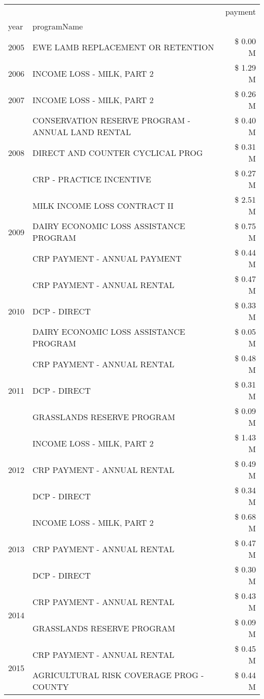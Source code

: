 \begin{tabular}{llr}
\toprule
 &  & payment \\
year & programName &  \\
\midrule
2005 & EWE LAMB REPLACEMENT OR RETENTION & \$ 0.00 M \\
\cline{1-3}
2006 & INCOME LOSS - MILK, PART 2 & \$ 1.29 M \\
\cline{1-3}
2007 & INCOME LOSS - MILK, PART 2 & \$ 0.26 M \\
\cline{1-3}
\multirow[t]{3}{*}{2008} & CONSERVATION RESERVE PROGRAM - ANNUAL LAND RENTAL & \$ 0.40 M \\
 & DIRECT AND COUNTER CYCLICAL PROG & \$ 0.31 M \\
 & CRP - PRACTICE INCENTIVE & \$ 0.27 M \\
\cline{1-3}
\multirow[t]{3}{*}{2009} & MILK INCOME LOSS CONTRACT II & \$ 2.51 M \\
 & DAIRY ECONOMIC LOSS ASSISTANCE PROGRAM & \$ 0.75 M \\
 & CRP PAYMENT - ANNUAL PAYMENT & \$ 0.44 M \\
\cline{1-3}
\multirow[t]{3}{*}{2010} & CRP PAYMENT - ANNUAL RENTAL & \$ 0.47 M \\
 & DCP - DIRECT & \$ 0.33 M \\
 & DAIRY ECONOMIC LOSS ASSISTANCE PROGRAM & \$ 0.05 M \\
\cline{1-3}
\multirow[t]{3}{*}{2011} & CRP PAYMENT - ANNUAL RENTAL & \$ 0.48 M \\
 & DCP - DIRECT & \$ 0.31 M \\
 & GRASSLANDS RESERVE PROGRAM & \$ 0.09 M \\
\cline{1-3}
\multirow[t]{3}{*}{2012} & INCOME LOSS - MILK, PART 2 & \$ 1.43 M \\
 & CRP PAYMENT - ANNUAL RENTAL & \$ 0.49 M \\
 & DCP - DIRECT & \$ 0.34 M \\
\cline{1-3}
\multirow[t]{3}{*}{2013} & INCOME LOSS - MILK, PART 2 & \$ 0.68 M \\
 & CRP PAYMENT - ANNUAL RENTAL & \$ 0.47 M \\
 & DCP - DIRECT & \$ 0.30 M \\
\cline{1-3}
\multirow[t]{2}{*}{2014} & CRP PAYMENT - ANNUAL RENTAL & \$ 0.43 M \\
 & GRASSLANDS RESERVE PROGRAM & \$ 0.09 M \\
\cline{1-3}
\multirow[t]{3}{*}{2015} & CRP PAYMENT - ANNUAL RENTAL & \$ 0.45 M \\
 & AGRICULTURAL RISK COVERAGE PROG - COUNTY & \$ 0.44 M \\

\end{tabular}
